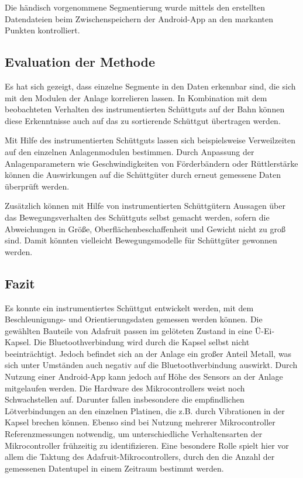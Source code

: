 Die händisch vorgenommene Segmentierung wurde mittels den erstellten Datendateien beim Zwischenspeichern der Android-App an den markanten Punkten kontrolliert.

\subsection{Evaluation der Methode}
Es hat sich gezeigt, dass einzelne Segmente in den Daten erkennbar sind, die sich mit den Modulen der Anlage korrelieren lassen. In Kombination mit dem beobachteten Verhalten des instrumentierten Schüttguts auf der Bahn können diese Erkenntnisse auch auf das zu sortierende Schüttgut übertragen werden. 

Mit Hilfe des instrumentierten Schüttguts lassen sich beispielsweise Verweilzeiten auf den einzelnen Anlagenmodulen bestimmen. Durch Anpassung der Anlagenparametern wie Geschwindigkeiten von Förderbändern oder Rüttlerstärke können die Auswirkungen auf die Schüttgüter durch erneut gemessene Daten überprüft werden.

Zusätzlich können mit Hilfe von instrumentierten Schüttgütern Aussagen über das Bewegungsverhalten des Schüttguts selbst gemacht werden, sofern die Abweichungen in Größe, Oberflächenbeschaffenheit und Gewicht nicht zu groß sind. Damit könnten vielleicht Bewegungsmodelle für Schüttgüter gewonnen werden.

\subsection{Fazit}

Es konnte ein instrumentiertes Schüttgut entwickelt werden, mit dem Beschleunigungs- und Orientierungsdaten gemessen werden können. Die gewählten Bauteile von Adafruit passen im gelöteten Zustand in eine Ü-Ei-Kapsel. Die Bluetoothverbindung wird durch die Kapsel selbst nicht beeinträchtigt. Jedoch befindet sich an der Anlage ein großer Anteil Metall, was sich unter Umständen auch negativ auf die Bluetoothverbindung auswirkt. Durch Nutzung einer Android-App kann jedoch auf Höhe des Sensors an der Anlage mitgelaufen werden. Die Hardware des Mikrocontrollers weist noch Schwachstellen auf. Darunter fallen insbesondere die empfindlichen Lötverbindungen an den einzelnen Platinen, die z.B. durch Vibrationen in der Kapsel brechen können. Ebenso sind bei Nutzung mehrerer Mikrocontroller Referenzmessungen notwendig, um unterschiedliche Verhaltensarten der Mikrocontroller frühzeitig zu identifizieren. Eine besondere Rolle spielt hier vor allem die Taktung des Adafruit-Mikrocontrollers, durch den die Anzahl der gemessenen Datentupel in einem Zeitraum bestimmt werden.

